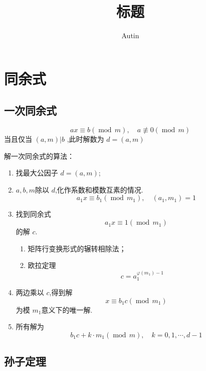 \documentclass[lang=cn,12pt,color=green,fontset=none]{elegantbook}
\title{标题}
\author{Autin}
\begin{document}
\large
\maketitle
\frontmatter

\tableofcontents

\mainmatter
\chapter{同余式 }

\section{一次同余式}

\begin{theorem}
    \[
    ax\equiv b\left( \operatorname{mod}\, m \right),\quad a \not\equiv  0 \left( \operatorname{mod}\,m \right)  
    \]当且仅当  \(  \left( a,m \right) |b   \) ,此时解数为 \(  d =  \left( a,m \right)   \) 
\end{theorem}

\noindent 解一次同余式的算法：
\begin{enumerate}
    \item 找最大公因子 \(  d =  \left( a,m \right)   \);
    \item \(  a,b,m  \)除以 \(  d  \),化作系数和模数互素的情况. \[
    a_1x \equiv b_1 \left( \operatorname{mod}\,m_1 \right) ,\quad \left( a_1,m_1 \right)= 1 
    \]   
    \item 找到同余式 \[
    a_1x \equiv 1\left( \operatorname{mod}\,m_1 \right) 
    \]的解 \(  c  \).
    \begin{enumerate}
        \item 矩阵行变换形式的辗转相除法；
        \item 欧拉定理 \[
        c =  a_1^{\varphi \left( m_1 \right)-1 }
        \]
    \end{enumerate}
     \item 两边乘以 \(  c  \),得到解 \[
     x \equiv b_1c \left( \operatorname{mod}\,m_1 \right) 
     \] 为模 \(  m_1  \)意义下的唯一解.
     \item 所有解为 \[
     b_1c+  k\cdot m_1\left( \operatorname{mod}\,m \right),\quad k= 0,1,\cdots ,d-1 
     \] 
\end{enumerate}
\section{孙子定理}
\end{document}

